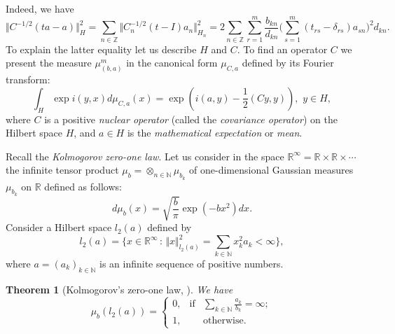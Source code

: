 \documentclass[preprint,12pt]{elsarticle}
\newtheorem{thm}{Theorem}[section]
\numberwithin{equation}{section}
\begin{document}
{\small Indeed, we have
$$
\Vert C^{-1/2}(ta-a)\Vert^2_H\!=\!\!\sum_{n\in {\mathbb Z}}
\Vert C_n^{-1/2}(t-I)a_n\Vert^2_{H_n}\!=\!2\!\sum_{n\in
{\mathbb Z}}\sum_{r=1}^m
\frac{b_{kn}}{d_{kn}}\Big(\sum_{s=1}^m(t_{rs}\!-\delta_{rs})a_{sn}\Big)^2\!d_{kn}.
$$
To explain the latter equality let us describe $H$ and $C$. To
find an operator $C$ we present the measure $\mu^m_{(b,a)}$ in the
canonical form $\mu_{C,a}$ defined by its Fourier transform:
\begin{equation}
\label{A.F(H,mu_B),}
 \int_{H}\exp i(y,x)d\mu_{C,a}(x)=\exp\left(i(a,y)-\frac{1}{2}(Cy,y)\right),\,\,
y\in H,
\end{equation}
where $C$ is a positive {\it nuclear operator} (called the {\it
covariance operator}) on the Hilbert space $H$, and $a\in H$ is
the {\it mathematical expectation} or {\it mean}.
}

Recall the {\it Kolmogorov zero-one law}. Let us consider in the space ${\mathbb R}^\infty={\mathbb
R}\times {\mathbb R}\times\cdots$ the infinite tensor product  $\mu_b=\otimes_{n\in
{\mathbb N}}\mu_{b_k}$  of one-dimensional Gaussian measures $\mu_{b_k}$ on $\mathbb R$ defined as follows:
\begin{equation}
\label{A.mu-(b,a)}
d\mu_{b}(x)=\sqrt{\frac{b}{\pi}}\exp(-bx^2)dx.
\end{equation}
Consider a Hilbert space $l_2(a)$ defined by
\begin{equation*}
l_2(a)=\big\{x\in {\mathbb R}^\infty\,:\, \Vert x
\Vert^2_{l_2(a)}=\sum_{k\in {\mathbb N}}x_k^2a_k<\infty\big\},
\end{equation*}
where $a=(a_k)_{k\in {\mathbb N}}$ is an infinite sequence of
positive numbers.
%
\begin{thm}[Kolmogorov's zero-one law, \cite{ShFDT67}]
\label{A.Kol-0-1}
We have
$$
\mu_b(l_2(a))= \left\{\begin{array}{ccc} 0,&\text{if}&\sum_{k\in
{\mathbb N}}\frac{a_k}{b_k}=\infty;\\
1,&&\text{otherwise}.
\end{array}\right.
$$
\end{thm}
%
\end{document}
